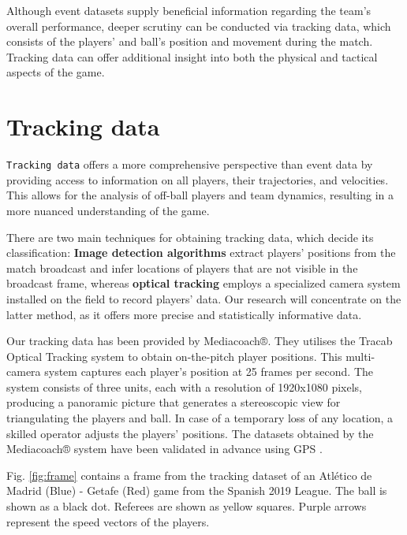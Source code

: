 \documentclass[
  10pt,
  twoside,nohyper]{book}
\begin{document}
Although event datasets supply beneficial information regarding the team's overall performance, deeper scrutiny can be conducted via tracking data, which consists of the players' and ball's position and movement during the match. Tracking data can offer additional insight into both the physical and tactical aspects of the game.

\section{Tracking data}\label{tracking-data}

\texttt{Tracking\ data} offers a more comprehensive perspective than event data by providing access to information on all players, their trajectories, and velocities. This allows for the analysis of off-ball players and team dynamics, resulting in a more nuanced understanding of the game.

There are two main techniques for obtaining tracking data, which decide its classification: \textbf{Image detection algorithms} extract players' positions from the match broadcast and infer locations of players that are not visible in the broadcast frame, whereas \textbf{optical tracking} employs a specialized camera system installed on the field to record players' data. Our research will concentrate on the latter method, as it offers more precise and statistically informative data.

Our tracking data has been provided by Mediacoach®. They utilises the Tracab Optical Tracking system to obtain on-the-pitch player positions. This multi-camera system captures each player's position at 25 frames per second. The system consists of three units, each with a resolution of 1920x1080 pixels, producing a panoramic picture that generates a stereoscopic view for triangulating the players and ball. In case of a temporary loss of any location, a skilled operator adjusts the players' positions. The datasets obtained by the Mediacoach® system have been validated in advance using GPS \autocite{Felipe2019ValidationOA}.

Fig. \ref{fig:frame} contains a frame from the tracking dataset of an Atlético de Madrid (Blue) - Getafe (Red) game from the Spanish 2019 League. The ball is shown as a black dot. Referees are shown as yellow squares. Purple arrows represent the speed vectors of the players.
\end{document}
